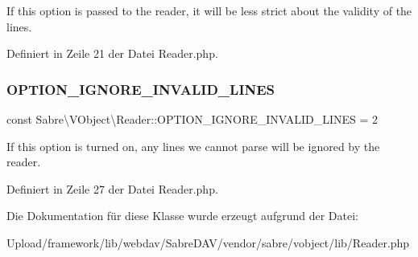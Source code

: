If this option is passed to the reader, it will be less strict about the validity of the lines. 

Definiert in Zeile 21 der Datei Reader.\+php.

\mbox{\label{class_sabre_1_1_v_object_1_1_reader_a385ec22924843a98e5cb0844fd9230f0}} 
\subsubsection{\texorpdfstring{O\+P\+T\+I\+O\+N\+\_\+\+I\+G\+N\+O\+R\+E\+\_\+\+I\+N\+V\+A\+L\+I\+D\+\_\+\+L\+I\+N\+ES}{OPTION\_IGNORE\_INVALID\_LINES}}
{\footnotesize\ttfamily const Sabre\textbackslash{}\+V\+Object\textbackslash{}\+Reader\+::\+O\+P\+T\+I\+O\+N\+\_\+\+I\+G\+N\+O\+R\+E\+\_\+\+I\+N\+V\+A\+L\+I\+D\+\_\+\+L\+I\+N\+ES = 2}

If this option is turned on, any lines we cannot parse will be ignored by the reader. 

Definiert in Zeile 27 der Datei Reader.\+php.



Die Dokumentation für diese Klasse wurde erzeugt aufgrund der Datei\+:\begin{DoxyCompactItemize}
\item 
Upload/framework/lib/webdav/\+Sabre\+D\+A\+V/vendor/sabre/vobject/lib/Reader.\+php\end{DoxyCompactItemize}

